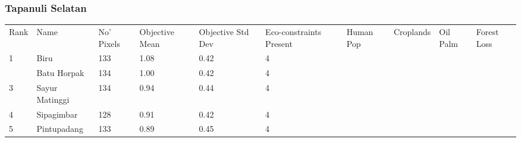 \subsubsection{Tapanuli Selatan}
\begin{table}[ht]
\centering
\begingroup\fontsize{9pt}{10pt}\selectfont
\begin{tabular}{C{0.05\textwidth}C{0.15\textwidth}C{0.08\textwidth}C{0.08\textwidth}C{0.08\textwidth}C{0.08\textwidth}C{0.08\textwidth}C{0.08\textwidth}C{0.08\textwidth}C{0.08\textwidth}}
 Rank & Name & No' Pixels & Objective Mean & Objective Std Dev & Eco-constraints  Present & Human Pop & Croplands & Oil Palm & Forest Loss \\ 
 {1} & Biru & 133 & \textcolor[HTML]{FFFFFF}{1.08} & \textcolor[HTML]{000000}{0.42} & \textcolor[HTML]{FFFFFF}{4} &  &  &  &  \\ 
   & Batu Horpak & 134 & \textcolor[HTML]{FFFFFF}{1.00} & \textcolor[HTML]{000000}{0.42} & \textcolor[HTML]{FFFFFF}{4} &  &  &  &  \\ 
  {3} & Sayur Matinggi & 134 & \textcolor[HTML]{000000}{0.94} & \textcolor[HTML]{FFFFFF}{0.44} & \textcolor[HTML]{FFFFFF}{4} &  &  &  &  \\ 
  {4} & Sipagimbar & 128 & \textcolor[HTML]{000000}{0.91} & \textcolor[HTML]{000000}{0.42} & \textcolor[HTML]{FFFFFF}{4} &  &  &  &  \\ 
  {5} & Pintupadang & 133 & \textcolor[HTML]{000000}{0.89} & \textcolor[HTML]{FFFFFF}{0.45} & \textcolor[HTML]{FFFFFF}{4} &  &  &  &  \\ 

\end{tabular}
\end{table}
